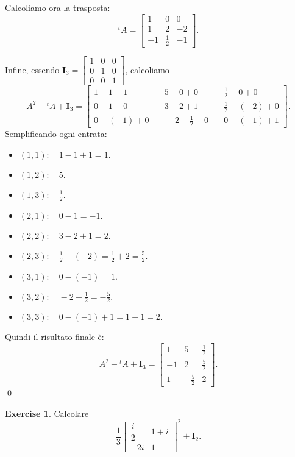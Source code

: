 \documentclass{article}
\theoremstyle{plain}
\theoremstyle{definition}
\newtheorem{xca}[exmp]{Exercise}
\theoremstyle{remark}
\begin{document}
Calcoliamo ora la trasposta:
\[
{}^{t}A=\begin{bmatrix}
1 & 0 & 0\\[4mm]
1 & 2 & -2\\[4mm]
-1 & \frac{1}{2} & -1
\end{bmatrix}.
\]

Infine, essendo \(\mathbf{I}_3=\begin{bmatrix}1&0&0\\[2mm]0&1&0\\[2mm]0&0&1\end{bmatrix}\), calcoliamo
\[
A^2-{}^{t}A+\mathbf{I}_3=
\begin{bmatrix}
1-1+1 &\quad 5-0+0 &\quad \frac{1}{2}-0+0\\[4mm]
0-1+0 &\quad 3-2+1 &\quad \frac{1}{2}-(-2)+0\\[4mm]
0-(-1)+0 &\quad -2-\frac{1}{2}+0 &\quad 0-(-1)+1
\end{bmatrix}.
\]
Semplificando ogni entrata:
\begin{itemize}
    \item \((1,1):\quad 1-1+1=1.\)
    \item \((1,2):\quad 5.\)
    \item \((1,3):\quad \frac{1}{2}.\)
    \item \((2,1):\quad 0-1=-1.\)
    \item \((2,2):\quad 3-2+1=2.\)
    \item \((2,3):\quad \frac{1}{2}-(-2)=\frac{1}{2}+2=\frac{5}{2}.\)
    \item \((3,1):\quad 0-(-1)=1.\)
    \item \((3,2):\quad -2-\frac{1}{2}=-\frac{5}{2}.\)
    \item \((3,3):\quad 0-(-1)+1=1+1=2.\)
\end{itemize}
Quindi il risultato finale è:
\[
A^2-{}^{t}A+\mathbf{I}_3=
\begin{bmatrix}
1 & 5 & \frac{1}{2}\\[4mm]
-1 & 2 & \frac{5}{2}\\[4mm]
1 & -\frac{5}{2} & 2
\end{bmatrix}.
\]
\qed

\vspace{10pt}

\begin{bxthm}
\begin{xca}
    Calcolare 
    \[\dfrac{1}{3}\begin{bmatrix}
        \dfrac{i}{2}&1+i\\[2mm]
        -2i&1
    \end{bmatrix}^2+\mathbf{I}_2.\]
\end{xca}
\end{bxthm}
\end{document}
